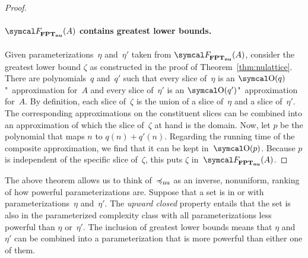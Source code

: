\begin{proof}
  \paragraph{$\calF_\clnu{FPT}(A)$ contains greatest lower bounds.}
  Given parameterizations~$\eta$ and~$\eta'$ taken from $\calF_\clnu{FPT}(A)$, consider the greatest lower bound $\zeta$ as constructed in the proof of Theorem~\ref{thm:nulattice}.
  There are polynomials~$q$ and~$q'$ such that every slice of~$\eta$ is an $\bigO(q)$"~approximation for~$A$ and every slice of~$\eta'$ is an $\bigO(q')$"~approximation for~$A$.
  By definition, each slice of~$\zeta$ is the union of a slice of~$\eta$ and a slice of~$\eta'$.
  The corresponding approximations on the constituent slices can be combined into an approximation of which the slice of~$\zeta$ at hand is the domain.
  Now, let $p$ be the polynomial that maps $n$ to $q(n) + q'(n)$.
  Regarding the running time of the composite approximation, we find that it can be kept in~$\bigO(p)$.
  Because $p$ is independent of the specific slice of~$\zeta$, this puts $\zeta$ in~$\calF_\clnu{FPT}(A)$.
\end{proof}

The above theorem allows us to think of~$\preccurlyeq_\mathrm{nu}$ as an inverse, nonuniform, ranking of how powerful parameterizations are.
Suppose that a set is in  or  with parameterizations~$\eta$ and~$\eta'$.
The \emph{upward closed} property entails that the set is also in the parameterized complexity class with all parameterizations less powerful than $\eta$ or~$\eta'$.
The inclusion of greatest lower bounds means that $\eta$ and~$\eta'$ can be combined into a parameterization that is more powerful than either one of them.

